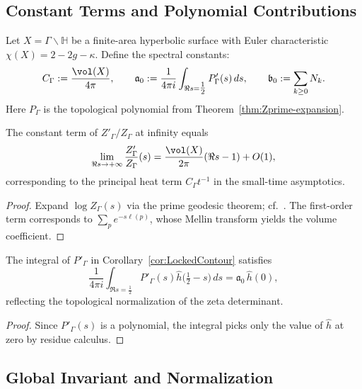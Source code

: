 \subsection{Constant Terms and Polynomial Contributions} \label{subsec:constants} %

\begin{definition} \label{def:Constants} %
Let \(X=\Gamma\backslash\mathbb H\) be a finite-area hyperbolic surface with Euler characteristic \(\chi(X)=2-2g-\kappa\).
Define the spectral constants:
\[
  C_\Gamma := \frac{\vol(X)}{4\pi},\qquad
  \mathfrak{a}_0 := \frac{1}{4\pi i}\int_{\Re s=\tfrac12} P'_\Gamma(s)\,ds,\qquad
  \mathfrak{b}_0 := \sum_{k\ge0} N_k.
\]
Here \(P_\Gamma\) is the topological polynomial from Theorem~\ref{thm:Zprime-expansion}. %
\end{definition}

\begin{lemma} \label{lem:SelbergConstant} %
The constant term of \(Z'_\Gamma/Z_\Gamma\) at infinity equals
\[
  \lim_{\Re s\to +\infty} \frac{Z'_\Gamma}{Z_\Gamma}(s)
  = \frac{\vol(X)}{2\pi}(\Re s - 1) + O(1),
\]
corresponding to the principal heat term \(C_\Gamma t^{-1}\) in the small-time asymptotics. %
\end{lemma}

\begin{proof}
Expand $\log Z_\Gamma(s)$ via the prime geodesic theorem; cf.\ \cite{HejhalII, SelbergCollected}. The first-order term corresponds to $\sum_p e^{-s\ell(p)}$, whose Mellin transform yields the volume coefficient. %
\end{proof}

\begin{lemma} \label{lem:TopTerm} %
The integral of \(P'_\Gamma\) in Corollary~\ref{cor:LockedContour} satisfies
\[
  \frac{1}{4\pi i}\int_{\Re s=\tfrac12} P'_\Gamma(s)\widehat h\!\Big(\tfrac12-s\Big)\,ds
  = \mathfrak{a}_0\,\widehat h(0),
\]
reflecting the topological normalization of the zeta determinant. %
\end{lemma}

\begin{proof}
Since \(P'_\Gamma(s)\) is a polynomial, the integral picks only the value of \(\widehat h\) at zero by residue calculus. %
\end{proof}

\subsection{Global Invariant and Normalization} \label{subsec:global-invariant} %

